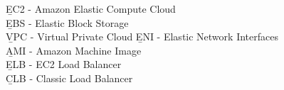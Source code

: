 \b{EC2} - Amazon Elastic Compute Cloud \\
\b{EBS} - Elastic Block Storage \\
\b{VPC} - Virtual Private Cloud
\b{ENI} - Elastic Network Interfaces \\
\b{AMI} - Amazon Machine Image \\
\b{ELB} - EC2 Load Balancer \\
\b{CLB} - Classic Load Balancer \\